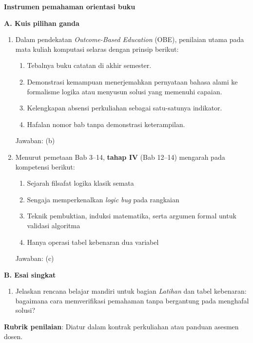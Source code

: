 \documentclass[../main]{subfiles}
\begin{document}
\begin{asesmen}
\textbf{Instrumen pemahaman orientasi buku}

\textbf{A. Kuis pilihan ganda}

\begin{enumerate}
  \item Dalam pendekatan \textit{Outcome-Based Education} (OBE), penilaian utama pada mata kuliah komputasi selaras dengan prinsip berikut:
  \begin{enumerate}
    \item Tebalnya buku catatan di akhir semester.
    \item Demonstrasi kemampuan menerjemahkan pernyataan bahasa alami ke formalisme logika atau menyusun solusi yang memenuhi capaian.
    \item Kelengkapan absensi perkuliahan sebagai satu-satunya indikator.
    \item Hafalan nomor bab tanpa demonstrasi keterampilan.
  \end{enumerate}
  Jawaban: (b)

  \item Menurut pemetaan Bab 3--14, \textbf{tahap IV} (Bab 12--14) mengarah pada kompetensi berikut:
  \begin{enumerate}
    \item Sejarah filsafat logika klasik semata
    \item Sengaja memperkenalkan \textit{logic bug} pada rangkaian
    \item Teknik pembuktian, induksi matematika, serta argumen formal untuk validasi algoritma
    \item Hanya operasi tabel kebenaran dua variabel
  \end{enumerate}
  Jawaban: (c)
\end{enumerate}

\textbf{B. Esai singkat}

\begin{enumerate}
  \item Jelaskan rencana belajar mandiri untuk bagian \textit{Latihan} dan tabel kebenaran: bagaimana cara memverifikasi pemahaman tanpa bergantung pada menghafal solusi?
\end{enumerate}

\textbf{Rubrik penilaian}: Diatur dalam kontrak perkuliahan atau panduan asesmen dosen.
\end{asesmen}
\end{document}
